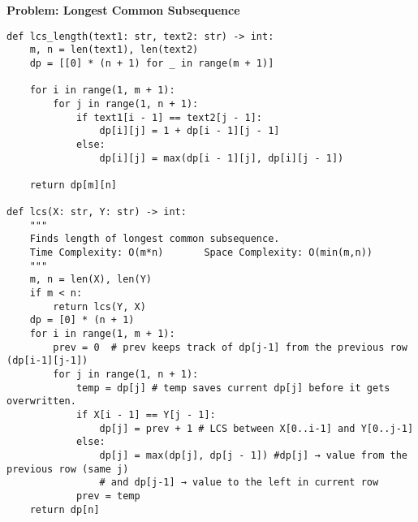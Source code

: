 \noindent\textbf{Problem: Longest Common Subsequence}
\begin{verbatim}
def lcs_length(text1: str, text2: str) -> int:
    m, n = len(text1), len(text2)
    dp = [[0] * (n + 1) for _ in range(m + 1)]

    for i in range(1, m + 1):
        for j in range(1, n + 1):
            if text1[i - 1] == text2[j - 1]:
                dp[i][j] = 1 + dp[i - 1][j - 1]
            else:
                dp[i][j] = max(dp[i - 1][j], dp[i][j - 1])

    return dp[m][n]

def lcs(X: str, Y: str) -> int:
    """
    Finds length of longest common subsequence.
    Time Complexity: O(m*n)       Space Complexity: O(min(m,n))
    """
    m, n = len(X), len(Y)
    if m < n:
        return lcs(Y, X)
    dp = [0] * (n + 1)
    for i in range(1, m + 1):
        prev = 0  # prev keeps track of dp[j-1] from the previous row (dp[i-1][j-1])
        for j in range(1, n + 1):
            temp = dp[j] # temp saves current dp[j] before it gets overwritten.
            if X[i - 1] == Y[j - 1]:
                dp[j] = prev + 1 # LCS between X[0..i-1] and Y[0..j-1]
            else:
                dp[j] = max(dp[j], dp[j - 1]) #dp[j] → value from the previous row (same j) 
                # and dp[j-1] → value to the left in current row
            prev = temp
    return dp[n]
\end{verbatim}

